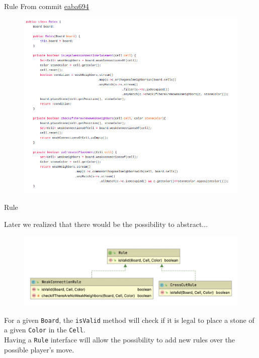 \documentclass{beamer}
\begin{document}
\begin{frame}{Rule}
	\small From commit \href{https://github.com/lorenzobasile/konobi/blob/eaba694d6662a1b6803f7f22943636176281e572/src/main/java/konobi/Rules.java}{eaba694}
	\begin{figure}
		\includegraphics[scale=0.25]{images/rules-class.png}
	\end{figure}
\end{frame}

\begin{frame}{Rule}
	
	Later we realized that there would be the possibility to abstract...
	\begin{figure}
		\includegraphics[scale=0.4]{images/rules-uml.jpg}
	\end{figure}

	For a given \texttt{Board}, the \texttt{isValid} method will check if it is legal to place a stone of a given \texttt{Color} in the \texttt{Cell}. \\
	\vspace{0.1cm}
	Having a \texttt{Rule} interface will allow the possibility to add new rules over the possible player's move.
	
\end{frame}
\end{document}
